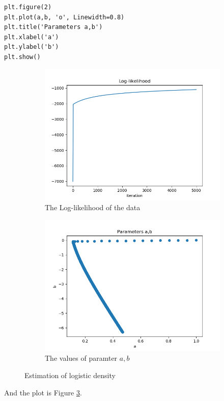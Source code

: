 \documentclass[preprint,12pt]{elsarticle}
\begin{document}
\begin{enumerate}
\begin{lstlisting}
plt.figure(2)
plt.plot(a,b, 'o', Linewidth=0.8)
plt.title('Parameters a,b')
plt.xlabel('a')
plt.ylabel('b')
plt.show()
        \end{lstlisting}

        \begin{figure}[htbp!]
            \center
            \begin{subfigure}{0.8\textwidth}
                \includegraphics[width = \textwidth]{1.png}
                \caption{The Log-likelihood of the data}
                \label{fig:11}
            \end{subfigure}
            \begin{subfigure}{0.8\textwidth}
                \includegraphics[width = \textwidth]{2.png}
                \caption{The values of paramter $a,b$}
                \label{fig:12}
            \end{subfigure}
            \caption{Estimation of logistic density}
            \label{fig:1}
        \end{figure}
        And the plot is Figure \ref{fig:1}.\\


\end{enumerate}
\end{document}
